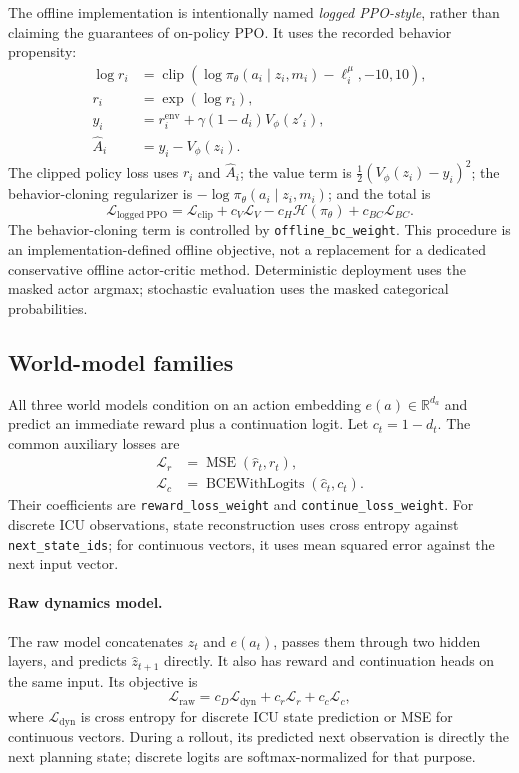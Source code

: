 \documentclass[10pt,twocolumn]{article}
\newcommand{\code}[1]{\texttt{#1}}
\newcommand{\R}{\mathbb{R}}
\newcommand{\policy}{\pi}
\newcommand{\behavior}{\mu}
\begin{document}
The offline implementation is intentionally named \emph{logged PPO-style}, rather than claiming the guarantees of on-policy PPO. It uses the recorded behavior propensity:
\begin{align}
 \log r_i &= \operatorname{clip}\left(\log\policy_\theta(a_i\mid z_i,m_i)-\ell_i^{\behavior},-10,10\right),\\
 r_i &= \exp(\log r_i),\\
 y_i &= r_i^{\mathrm{env}} + \gamma(1-d_i)V_\phi(z'_i),\\
 \hat A_i &= y_i - V_\phi(z_i).
\end{align}
The clipped policy loss uses $r_i$ and $\hat A_i$; the value term is $\frac12(V_\phi(z_i)-y_i)^2$; the behavior-cloning regularizer is $-\log\policy_\theta(a_i\mid z_i,m_i)$; and the total is
\begin{equation}
 \mathcal{L}_{\mathrm{logged\ PPO}} =
 \mathcal{L}_{\mathrm{clip}} + c_V\mathcal{L}_V - c_H\mathcal{H}(\policy_\theta)
 + c_{BC}\mathcal{L}_{BC}.
\end{equation}
The behavior-cloning term is controlled by \code{offline\_bc\_weight}. This procedure is an implementation-defined offline objective, not a replacement for a dedicated conservative offline actor-critic method. Deterministic deployment uses the masked actor argmax; stochastic evaluation uses the masked categorical probabilities.

\subsection{World-model families}
\label{sec:worldmodels}

All three world models condition on an action embedding $e(a)\in\R^{d_a}$ and predict an immediate reward plus a continuation logit. Let $c_t=1-d_t$. The common auxiliary losses are
\begin{align}
 \mathcal{L}_{r} &= \operatorname{MSE}(\hat r_t,r_t),\\
 \mathcal{L}_{c} &= \operatorname{BCEWithLogits}(\hat c_t,c_t).
\end{align}
Their coefficients are \code{reward\_loss\_weight} and \code{continue\_loss\_weight}. For discrete ICU observations, state reconstruction uses cross entropy against \code{next\_state\_ids}; for continuous vectors, it uses mean squared error against the next input vector.

\paragraph{Raw dynamics model.}
The raw model concatenates $z_t$ and $e(a_t)$, passes them through two hidden layers, and predicts $\hat z_{t+1}$ directly. It also has reward and continuation heads on the same input. Its objective is
\begin{equation}
  \mathcal{L}_{\mathrm{raw}} = c_D\mathcal{L}_{\mathrm{dyn}} + c_r\mathcal{L}_r + c_c\mathcal{L}_c,
\end{equation}
where $\mathcal{L}_{\mathrm{dyn}}$ is cross entropy for discrete ICU state prediction or MSE for continuous vectors. During a rollout, its predicted next observation is directly the next planning state; discrete logits are softmax-normalized for that purpose.
\end{document}
